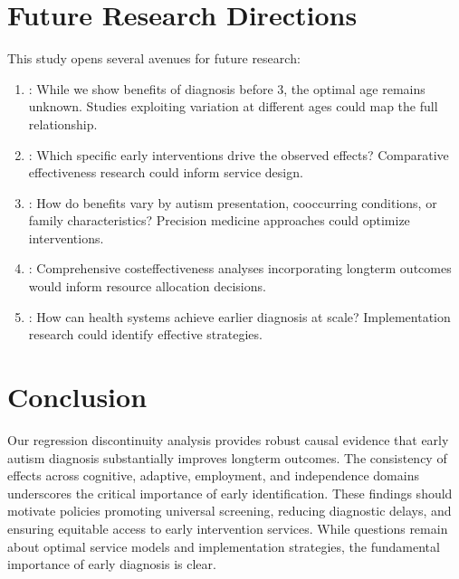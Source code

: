 \documentclass[letterpaper,10pt,english]{jupyterBook}
\begin{document}
\section{Future Research Directions}
\label{\detokenize{discussion:future-research-directions}}
\sphinxAtStartPar
This study opens several avenues for future research:
\begin{enumerate}
%
\item {} 
\sphinxAtStartPar
{}: While we show benefits of diagnosis before 3, the optimal age remains unknown. Studies exploiting variation at different ages could map the full relationship.

\item {} 
\sphinxAtStartPar
{}: Which specific early interventions drive the observed effects? Comparative effectiveness research could inform service design.

\item {} 
\sphinxAtStartPar
{}: How do benefits vary by autism presentation, co\sphinxhyphen{}occurring conditions, or family characteristics? Precision medicine approaches could optimize interventions.

\item {} 
\sphinxAtStartPar
{}: Comprehensive cost\sphinxhyphen{}effectiveness analyses incorporating long\sphinxhyphen{}term outcomes would inform resource allocation decisions.

\item {} 
\sphinxAtStartPar
{}: How can health systems achieve earlier diagnosis at scale? Implementation research could identify effective strategies.

\end{enumerate}


\section{Conclusion}
\label{\detokenize{discussion:conclusion}}
\sphinxAtStartPar
Our regression discontinuity analysis provides robust causal evidence that early autism diagnosis substantially improves long\sphinxhyphen{}term outcomes. The consistency of effects across cognitive, adaptive, employment, and independence domains underscores the critical importance of early identification. These findings should motivate policies promoting universal screening, reducing diagnostic delays, and ensuring equitable access to early intervention services. While questions remain about optimal service models and implementation strategies, the fundamental importance of early diagnosis is clear.
\end{document}
